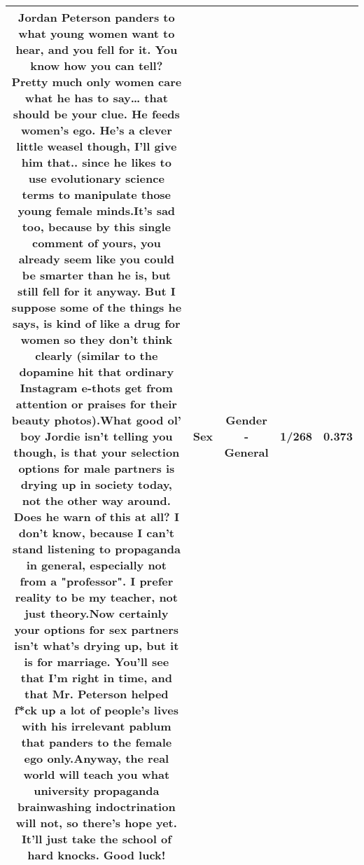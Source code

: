 \documentclass[11pt]{article}
\newlength\mylength
\begin{document}
\begin{center}
\begin{longtable}{|C{.65\mylength}|C{.30\mylength}|C{.12\mylength}|C{.12\mylength}|C{.12\mylength}|}
  \small Jordan Peterson panders to what young women want to hear, and you fell for it. You know how you can tell? Pretty much only women care what he has to say… that should be your clue. He feeds women's ego. He's a clever little weasel though, I'll give him that.. since he likes to use evolutionary science terms to manipulate those young female minds.It's sad too, because by this single comment of yours, you already seem like you could be smarter than he is, but still fell for it anyway. But I suppose some of the things he says, is kind of like a drug for women so they don't think clearly (similar to the dopamine hit that ordinary Instagram e-thots get from attention or praises for their beauty photos).What good ol' boy Jordie isn't telling you though, is that your selection options for male partners is drying up in society today, not the other way around. Does he warn of this at all? I don't know, because I can't stand listening to propaganda in general, especially not from a "professor". I prefer reality to be my teacher, not just theory.Now certainly your options for \textbf{sex} partners isn't what's drying up, but it is for marriage. You'll see that I'm right in time, and that Mr. Peterson helped f*ck up a lot of people's lives with his irrelevant pablum that panders to the female ego only.Anyway, the real world will teach you what university propaganda  brainwashing indoctrination will not, so there's hope yet. It'll just take the school of hard knocks. Good luck!\normalsize   & Sex & Gender - General & 1/268 & 0.373 \\  \hline

\end{longtable}
\end{center}
\end{document}
